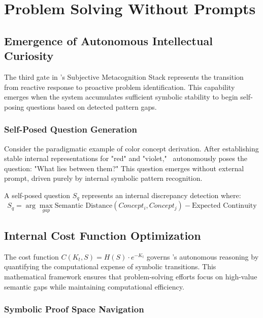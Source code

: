 \documentclass[12pt,twoside,openright]{report}
\begin{document}
\chapter{Problem Solving Without Prompts}

\section{Emergence of Autonomous Intellectual Curiosity}

The third gate in \obiai's Subjective Metacognition Stack represents the transition from reactive response to proactive problem identification. This capability emerges when the system accumulates sufficient symbolic stability to begin self-posing questions based on detected pattern gaps.

\subsection{Self-Posed Question Generation}

Consider the paradigmatic example of color concept derivation. After establishing stable internal representations for "red" and "violet," \obiai\ autonomously poses the question: "What lies between them?" This question emerges without external prompt, driven purely by internal symbolic pattern recognition.

\begin{definition}
A self-posed question $S_q$ represents an internal discrepancy detection where:
\begin{equation}
S_q = \arg\max_{gap} \text{Semantic Distance}(Concept_i, Concept_j) - \text{Expected Continuity}
\end{equation}
\end{definition}

\section{Internal Cost Function Optimization}

The cost function $C(K_t, S) = H(S) \cdot e^{-K_t}$ governs \obiai's autonomous reasoning by quantifying the computational expense of symbolic transitions. This mathematical framework ensures that problem-solving efforts focus on high-value semantic gaps while maintaining computational efficiency.

\subsection{Symbolic Proof Space Navigation}
\end{document}
